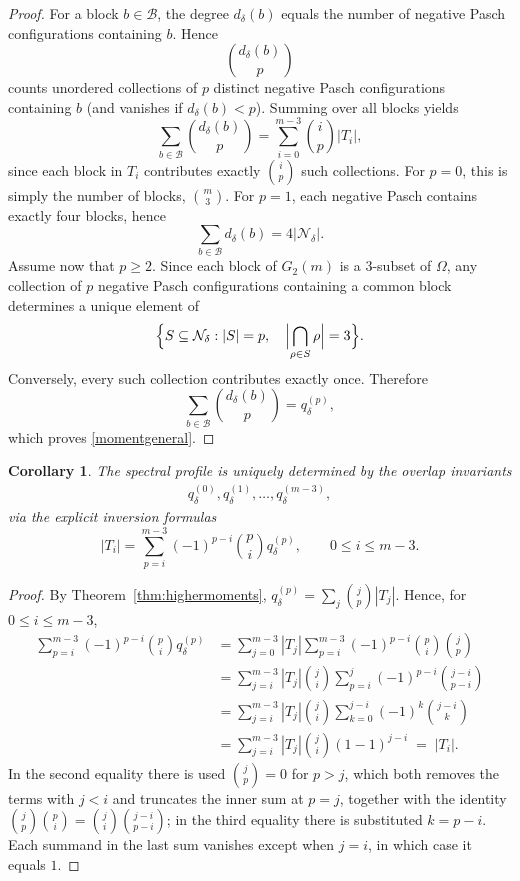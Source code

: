 \documentclass[times,11pt,reqno]{amsproc}
\newtheorem{corollary}[theorem]{Corollary}
\theoremstyle{definition}
\numberwithin{equation}{section}
\begin{document}
\begin{proof}
For a block $b\in\mathcal B$, the degree $d_\delta(b)$ equals the number of negative Pasch configurations containing $b$. Hence $$ \binom{d_\delta(b)}{p} $$ counts unordered collections of $p$ distinct negative Pasch configurations containing $b$ (and vanishes if $d_\delta(b)<p$). Summing over all blocks yields $$ \sum_{b\in\mathcal B} \binom{d_\delta(b)}{p} = \sum_{i=0}^{m-3} \binom{i}{p}|T_i|, $$ since each block in $T_i$ contributes exactly $\binom{i}{p}$ such collections.
For $p=0$, this is simply the number of blocks,
$\binom{m}{3}.$
For $p=1$, each negative Pasch contains exactly four blocks, hence
$$
\sum_{b\in\mathcal B}d_\delta(b)
=
4|\mathcal N_\delta|.
$$
Assume now that $p\ge2$. Since each block of $G_2(m)$ is a $3$-subset
of $\Omega$, any collection of $p$ negative Pasch configurations
containing a common block determines a unique element of
$$
\Bigl\{
S\subseteq\mathcal N_\delta:
|S|=p,
\quad
\Bigl|\bigcap_{\rho\in S}\rho\Bigr|=3
\Bigr\}.
$$
Conversely, every such collection contributes exactly once. Therefore
$$
\sum_{b\in\mathcal B}
\binom{d_\delta(b)}{p}
=
q_\delta^{(p)},
$$
which proves \eqref{momentgeneral}.
\end{proof}



\begin{corollary}\label{cor:spectraloverlap}
The spectral profile is uniquely determined by the overlap invariants
\begin{align}\label{overlapinvariants}
q_\delta^{(0)},
q_\delta^{(1)},
\dots,
q_\delta^{(m-3)},
\end{align}
via the explicit inversion formulas
\begin{equation}\label{momentgeneralinverse}
|T_i|
=
\sum_{p=i}^{m-3}
(-1)^{p-i}
\binom{p}{i}
q_\delta^{(p)},
\qquad
0\le i\le m-3.
\end{equation}
\end{corollary}


\begin{proof}
By Theorem~\ref{thm:highermoments}, $q_\delta^{(p)}=\sum_j\binom{j}{p}|T_j|$.
Hence, for $0\le i\le m-3$,
\begin{align*}
\sum_{p=i}^{m-3}(-1)^{p-i}\binom{p}{i}q_\delta^{(p)}
&=
\sum_{j=0}^{m-3}|T_j|
\sum_{p=i}^{m-3}(-1)^{p-i}\binom{p}{i}\binom{j}{p}
\\
&=
\sum_{j=i}^{m-3}|T_j|\binom{j}{i}
\sum_{p=i}^{j}(-1)^{p-i}\binom{j-i}{p-i}
\\
&=
\sum_{j=i}^{m-3}|T_j|\binom{j}{i}
\sum_{k=0}^{j-i}(-1)^{k}\binom{j-i}{k}
\\
&=
\sum_{j=i}^{m-3}|T_j|\binom{j}{i}(1-1)^{j-i}
\;=\;
|T_i| .
\end{align*}
In the second equality there is used $\binom{j}{p}=0$ for $p>j$, which both
removes the terms with $j<i$ and truncates the inner sum at $p=j$,
together with the identity
$\binom{j}{p}\binom{p}{i}=\binom{j}{i}\binom{j-i}{p-i}$; in the third equality there is
substituted $k=p-i$. Each summand in the last sum vanishes except when $j=i$, in which case it
equals $1$.
\end{proof}
\end{document}
